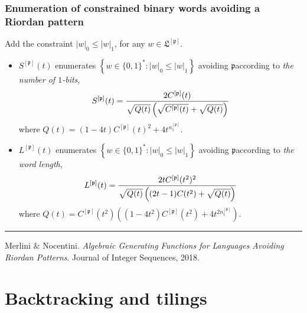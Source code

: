\documentclass[9pt]{beamer}
\begin{document}
\begin{frame}[fragile]
\frametitle{Enumeration of constrained binary words avoiding a Riordan pattern}

Add the constraint $|w|_0\leq |w|_1$, for any $w\in \mathfrak{L}^{[\mathfrak{p}]}$.
\begin{itemize}
\item $S^{[\mathfrak{p}]}(t)$ enumerates $\left\lbrace w\in \lbrace 0,1 \rbrace^{*}:
|w|_0\leq |w|_1\right\rbrace$ avoiding $\mathfrak{p}$\newline according to
\textit{the number of $1$-bits},
$$S^{[\mathfrak{p}]}(t)={2C^{[\mathfrak{p}]}(t) \over \sqrt{Q(t)}\left(\sqrt{C^{[\mathfrak{p}]}(t)}+ \sqrt{Q(t)} \right)} $$
    where $Q(t)={(1-4t)C^{[\mathfrak{p}]}(t)^2+4t^{n_1^{[\mathfrak{p}]}}}.$
\item $L^{[\mathfrak{p}]}(t)$ enumerates $\left\lbrace w\in \lbrace 0,1 \rbrace^{*}:
|w|_0\leq |w|_1\right\rbrace$ avoiding $\mathfrak{p}$\newline according to
\textit{the word length},
$$L^{[\mathfrak{p}]}(t)= {2tC^{[\mathfrak{p}]}(t^2)^2 \over \sqrt{Q(t)}\left((2t-1)C(t^2)+ \sqrt{ Q(t) } \right)}$$
where $Q(t)=C^{[\mathfrak{p}]}(t^2)\left( (1-4t^2)C^{[\mathfrak{p}]}(t^2)+4t^{2n_1^{[\mathfrak{p}]}}\right).$
\end{itemize}
\vfill
\noindent\rule{\textwidth}{0.1pt}
{\footnotesize
Merlini \& Nocentini. \textit{Algebraic Generating Functions for Languages
Avoiding Riordan Patterns}.  Journal of Integer Sequences, 2018.}
\end{frame}

\section{Backtracking and tilings}
\end{document}
